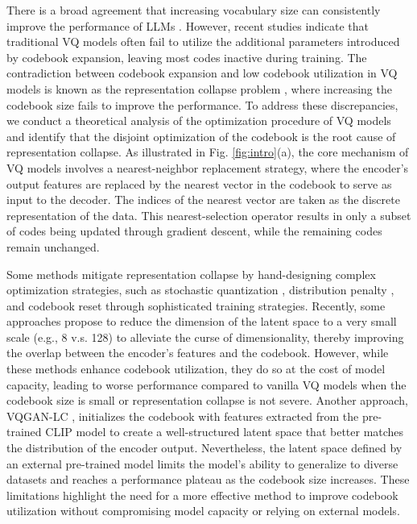 There is a broad agreement that increasing vocabulary size can consistently improve the performance of LLMs \cite{tao2024scaling}. However, recent studies \cite{Zhu2024ScalingTC} indicate that traditional VQ models often fail to utilize the additional parameters introduced by codebook expansion, leaving most codes inactive during training. The contradiction between codebook expansion and low codebook utilization in VQ models is known as the representation collapse problem \cite{roy2018theory}, where increasing the codebook size fails to improve the performance. To address these discrepancies, we conduct a theoretical analysis of the optimization procedure of VQ models and identify that the disjoint optimization of the codebook is the root cause of representation collapse. As illustrated in Fig. \ref{fig:intro}(a), the core mechanism of VQ models involves a nearest-neighbor replacement strategy, where the encoder’s output features are replaced by the nearest vector in the codebook to serve as input to the decoder. The indices of the nearest vector are taken as the discrete representation of the data. This nearest-selection operator results in only a subset of codes being updated through gradient descent, while the remaining codes remain unchanged. 


Some methods mitigate representation collapse by hand-designing complex optimization strategies, such as stochastic quantization \cite{pmlr-v162-takida22a}, distribution penalty \cite{VQWasserstein,Xiao2023SCVAESC}, and codebook reset \cite{zheng2023online} through sophisticated training strategies. 
Recently, some approaches \cite{yu2022vectorquantized,mentzer2024finite,yu2024language} propose to reduce the dimension of the latent space to a very small scale (e.g., 8 v.s. 128) to alleviate the curse of dimensionality, thereby improving the overlap between the encoder’s features and the codebook. However, while these methods enhance codebook utilization, they do so at the cost of model capacity, leading to worse performance compared to vanilla VQ models when the codebook size is small or representation collapse is not severe. Another approach, VQGAN-LC \cite{Zhu2024ScalingTC}, initializes the codebook with features extracted from the pre-trained CLIP model \cite{pmlr-v139-radford21a} to create a well-structured latent space that better matches the distribution of the encoder output. Nevertheless, the latent space defined by an external pre-trained model limits the model's ability to generalize to diverse datasets and reaches a performance plateau as the codebook size increases. These limitations highlight the need for a more effective method to improve codebook utilization without compromising model capacity or relying on external models.



